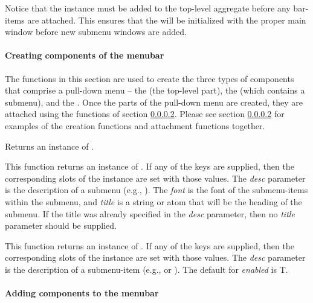 Notice that the  instance must be added to the top-level aggregate
before any bar-items are attached.  This ensures that the  will
be initialized with the proper main window before new submenu windows are
added.


\paragraph{Creating components of the menubar}
\label{creating-menubar-components}

The functions in this section are used to create the three types of components
that comprise a pull-down menu -- the  (the top-level part),
the  (which contains a submenu), and the .
Once the parts of the pull-down menu are created, they are attached using
the functions of section \ref{adding-menubar-components}.  Please see section
\ref{adding-menubar-components} for examples of the creation functions
and attachment functions together.

Returns an instance of .

This function returns an instance of .  If any of the keys are
supplied, then the corresponding slots of the  instance are
set with those values.  The {\it desc} parameter is the description of a
submenu (e.g., ).
The {\it font} is the font of the submenu-items within the submenu, and {\it title}
is a string or atom that will be the heading of the submenu.  If the title was
already specified in the {\it desc} parameter, then no {\it title} parameter should
be supplied.

This function returns an instance of .  If any of the
keys are supplied, then the corresponding slots of the 
instance are set with those values.  The {\it desc} parameter is the description
of a submenu-item (e.g.,  or ).
The default for {\it enabled} is T.


\paragraph{Adding components to the menubar}
\label{adding-menubar-components}

